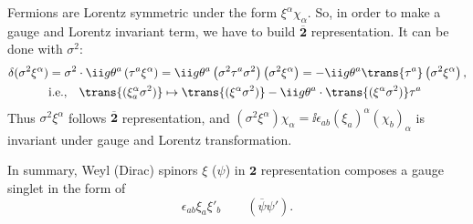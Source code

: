 Fermions are Lorentz symmetric under the form
 $\xi^\alpha\chi_\alpha$.
So, in order to make a gauge and Lorentz invariant term, we have to build $\overline{\boldsymbol 2}$ representation. It can be done with $\sigma^2$:
\begin{equation}\begin{split}
  \delta(\sigma^2\xi^\alpha) &=
\sigma^2\cdot\ii g\theta^a\left(\tau^a\xi^\alpha\right)
=
\ii g\theta^a\left(\sigma^2\tau^a\sigma^2\right)\left(\sigma^2\xi^\alpha\right)
=
-\ii g\theta^a\trans{\tau^a}\left(\sigma^2\xi^\alpha\right)
,\\
& \text{i.e.,}\quad \trans{(\xi^\alpha_a\sigma^2)}\mapsto\trans{(\xi^\alpha\sigma^2)}-\ii g\theta^a\cdot\trans{(\xi^\alpha\sigma^2)}\tau^a
\end{split}\end{equation}
Thus $\sigma^2\xi^\alpha$ follows $\overline{\boldsymbol 2}$ representation, and
$(\sigma^2\xi^\alpha)\chi_\alpha=\ii\epsilon_{ab}(\xi_a)^\alpha(\chi_b)_\alpha$ is invariant under gauge and Lorentz transformation.


In summary, Weyl (Dirac) spinors $\xi$ ($\psi$) in ${\boldsymbol 2}$ representation composes a gauge singlet in the form of
\begin{equation}
 \epsilon_{ab}\xi_a\xi'_b \qquad (\overline\psi \psi').
\end{equation}

